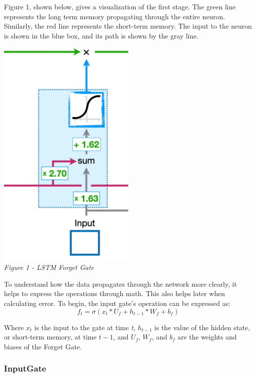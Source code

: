 \documentclass[12pt]{article}
\begin{document}
Figure 1, shown below, gives a visualization of the first stage. The green line
represents the long term memory propagating through the entire neuron.
Similarly, the red line represents the short-term memory. The input to the
neuron is shown in the blue box, and its path is shown by the gray line.

\begin{center}
    \includegraphics[width=0.5\textwidth]{ForgetGate.png}\\
    \emph{Figure 1 - LSTM Forget Gate}
\end{center}
To understand how the data propagates through the network more clearly, it
helps to express the operations through math. This also helps later when
calculating error. To begin, the input gate's operation can be expressed as:
\begin{equation}
    \label{eqn:f_t}
    f_t = \sigma(x_t*U_f + h_{t-1}*W_f + b_f)
\end{equation}

Where $x_t$ is the input to the gate at time \emph{t}, $h_{t-1}$ is the value
of the hidden state, or short-term memory, at time $t - 1$, and $U_f$, $W_f$,
and $b_f$ are the weights and biases of the Forget Gate.

\subsubsection{InputGate}
\end{document}
